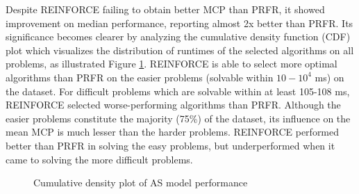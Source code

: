 Despite REINFORCE failing to obtain better MCP than PRFR, it showed improvement on median performance, reporting almost 2x better than PRFR.  Its significance becomes clearer by analyzing the cumulative density function (CDF) plot which visualizes the distribution of runtimes of the selected algorithms on all problems, as illustrated Figure \ref{fig:cdf}.  REINFORCE is able to select more optimal algorithms than PRFR on the easier problems (solvable within $10-10^4$ ms) on the dataset. For difficult problems which are solvable within at least 105-108 ms, REINFORCE selected worse-performing algorithms than PRFR. Although the easier problems constitute the majority (75\%) of the dataset, its influence on the mean MCP is much lesser than the harder problems. REINFORCE performed better than PRFR in solving the easy problems, but underperformed when it came to solving the more difficult problems. 

\begin{figure}[H]	
	\centering
	\caption{Cumulative density plot of AS model performance}
	\label{fig:cdf}
\end{figure}